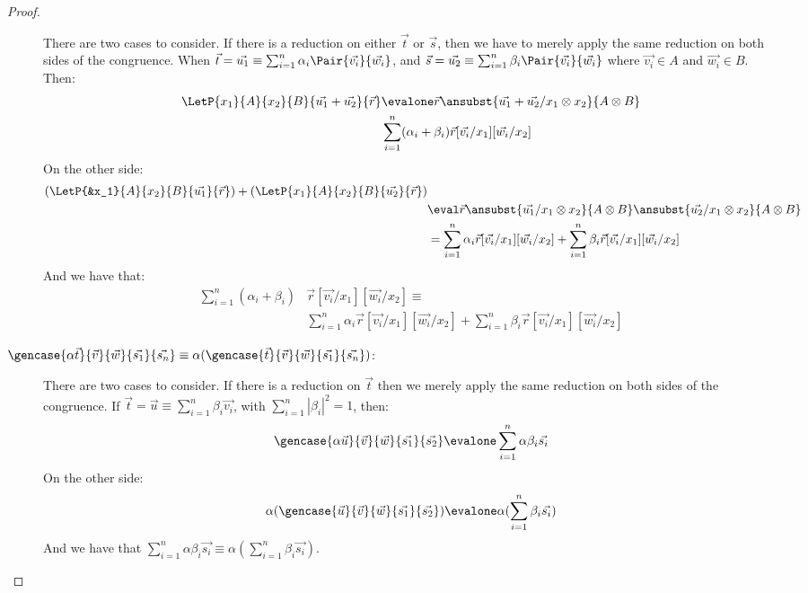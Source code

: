 \begin{proof}
\begin{description}
    There are two cases to consider. If there is a reduction on either $\vec{t}$ or $\vec{s}$, then we have to merely apply the same reduction on both sides of the congruence. When $\vec{t}=\vec{u_1}\equiv\sum_{i=1}^{n}\alpha_i\Pair{\vec{v_i}}{\vec{w_i}}$, and $\vec{s}=\vec{u_2}\equiv\sum_{i=1}^{n}\beta_i\Pair{\vec{v_i}}{\vec{w_i}}$ where $\vec{v_i}\in A$ and $\vec{w_i}\in B$. Then:
    \begin{align*}
      \LetP{x_1}{A}{x_2}{B}{\vec{u_1}+\vec{u_2}}{\vec{r}}&\evalone\vec{r}\ansubst{\vec{u_1}+\vec{u_2}/x_1\otimes x_2}{A\otimes B}\\
      &\sum_{i=1}^{n} (\alpha_i + \beta_i) \vec{r}[\vec{v_i}/x_1][\vec{w_i}/x_2]
    \end{align*}
    On the other side:
    \begin{align*}
      (\LetP{&x_1}{A}{x_2}{B}{\vec{u_1}}{\vec{r}})+(\LetP{x_1}{A}{x_2}{B}{\vec{u_2}}{\vec{r}})\\
      &\eval\vec{r}\ansubst{\vec{u_1}/x_1\otimes x_2}{A\otimes B}\ansubst{\vec{u_2}/x_1\otimes x_2}{A\otimes B}\\
      &=\sum_{i=1}^{n}\alpha_i \vec{r}[\vec{v_i}/x_1][\vec{w_i}/x_2] + \sum_{i=1}^{n}\beta_i\vec{r}[\vec{v_i}/x_1][\vec{w_i}/x_2]
    \end{align*}
    And we have that:
    \begin{align*}
      \sum_{i=1}^{n}(\alpha_i + \beta_i) &\vec{r}[\vec{v_i}/x_1][\vec{w_i}/x_2]\equiv\\
      &\sum_{i=1}^{n}\alpha_i \vec{r}[\vec{v_i}/x_1][\vec{w_i}/x_2] + \sum_{i=1}^{n}\beta_i \vec{r}[\vec{v_i}/x_1][\vec{w_i}/x_2]
    \end{align*}

  \item[$\gencase{\alpha \vec{t}}{\vec{v}}{\vec{w}}{\vec{s_1}}{\vec{s_n}}\equiv
  \alpha(\gencase{\vec{t}}{\vec{v}}{\vec{w}}{\vec{s_1}}{\vec{s_n}})$:] 
  There are two cases to consider. If there is a reduction on $\vec{t}$ then we merely apply the same reduction on both sides of the congruence. If $\vec{t}=\vec{u}\equiv\sum_{i=1}^{n}\beta_i \vec{v_i}$, with $\sum_{i=1}^{n}|\beta_i|^2=1$, then:
  \[
  \gencase{\alpha \vec{u}}{\vec{v}}{\vec{w}}{\vec{s_1}}{\vec{s_2}}\evalone
  \sum_{i=1}^{n}\alpha\beta_i \vec{s_i}
  \]
  On the other side:
  \[
  \alpha(\gencase{\vec{u}}{\vec{v}}{\vec{w}}{\vec{s_1}}{\vec{s_2}})\evalone
  \alpha(\sum_{i=1}^{n}\beta_i \vec{s_i})
  \]
  And we have that $\sum_{i=1}^{n}\alpha\beta_i \vec{s_i}\equiv\alpha(\sum_{i=1}^{n}\beta_i \vec{s_i})$.


\end{description}
\end{proof}
